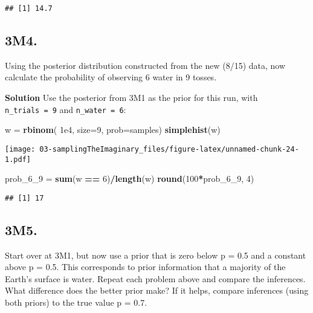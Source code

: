 \documentclass[
]{book}
\newenvironment{Shaded}{\begin{snugshade}}{\end{snugshade}}
\newcommand{\DataTypeTok}[1]{\textcolor[rgb]{0.13,0.29,0.53}{#1}}
\newcommand{\DecValTok}[1]{\textcolor[rgb]{0.00,0.00,0.81}{#1}}
\newcommand{\FloatTok}[1]{\textcolor[rgb]{0.00,0.00,0.81}{#1}}
\newcommand{\KeywordTok}[1]{\textcolor[rgb]{0.13,0.29,0.53}{\textbf{#1}}}
\newcommand{\NormalTok}[1]{#1}
\newcommand{\OperatorTok}[1]{\textcolor[rgb]{0.81,0.36,0.00}{\textbf{#1}}}
\newcommand{\StringTok}[1]{\textcolor[rgb]{0.31,0.60,0.02}{#1}}
\begin{document}
\begin{verbatim}
## [1] 14.7
\end{verbatim}

\hypertarget{m4.}{%
\subsection{3M4.}\label{m4.}}

Using the posterior distribution constructed from the new (8/15) data, now calculate the probability of observing 6 water in 9 tosses.

\textbf{Solution}
Use the posterior from 3M1 as the prior for this run, with \texttt{n\_trials\ =\ 9} and \texttt{n\_water\ =\ 6}:

\begin{Shaded}
\begin{Highlighting}[]
\NormalTok{w =}\StringTok{ }\KeywordTok{rbinom}\NormalTok{( }\FloatTok{1e4}\NormalTok{, }\DataTypeTok{size=}\DecValTok{9}\NormalTok{, }\DataTypeTok{prob=}\NormalTok{samples)}
\KeywordTok{simplehist}\NormalTok{(w)}
\end{Highlighting}
\end{Shaded}

\texttt{[image: 03-samplingTheImaginary\_files/figure-latex/unnamed-chunk-24-1.pdf]}

\begin{Shaded}
\begin{Highlighting}[]
\NormalTok{prob_}\DecValTok{6}\NormalTok{_}\DecValTok{9}\NormalTok{ =}\StringTok{ }\KeywordTok{sum}\NormalTok{(w }\OperatorTok{==}\StringTok{ }\DecValTok{6}\NormalTok{)}\OperatorTok{/}\KeywordTok{length}\NormalTok{(w)}
\KeywordTok{round}\NormalTok{(}\DecValTok{100}\OperatorTok{*}\NormalTok{prob_}\DecValTok{6}\NormalTok{_}\DecValTok{9}\NormalTok{, }\DecValTok{4}\NormalTok{)}
\end{Highlighting}
\end{Shaded}

\begin{verbatim}
## [1] 17
\end{verbatim}

\hypertarget{m5.}{%
\subsection{3M5.}\label{m5.}}

Start over at 3M1, but now use a prior that is zero below p = 0.5 and a constant above p = 0.5. This corresponds to prior information that a majority of the Earth's surface is water. Repeat each problem above and compare the inferences. What difference does the better prior make? If it helps, compare inferences (using both priors) to the true value p = 0.7.
\end{document}
